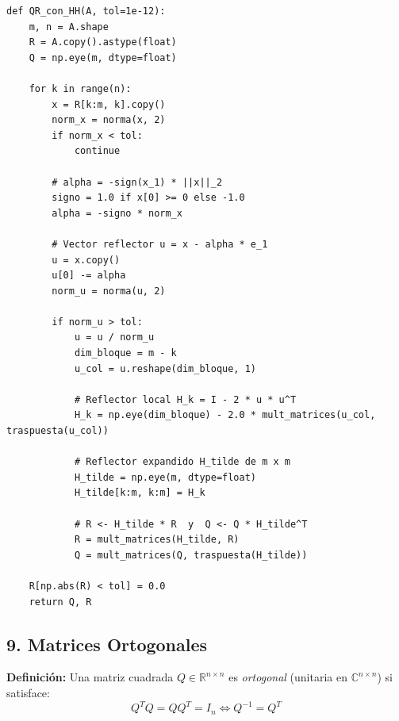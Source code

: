\documentclass[11pt,a4paper]{article}
\begin{document}
\begin{verbatim}
def QR_con_HH(A, tol=1e-12):
    m, n = A.shape
    R = A.copy().astype(float)
    Q = np.eye(m, dtype=float)

    for k in range(n):
        x = R[k:m, k].copy()
        norm_x = norma(x, 2)
        if norm_x < tol:
            continue

        # alpha = -sign(x_1) * ||x||_2
        signo = 1.0 if x[0] >= 0 else -1.0
        alpha = -signo * norm_x

        # Vector reflector u = x - alpha * e_1
        u = x.copy()
        u[0] -= alpha
        norm_u = norma(u, 2)

        if norm_u > tol:
            u = u / norm_u
            dim_bloque = m - k
            u_col = u.reshape(dim_bloque, 1)

            # Reflector local H_k = I - 2 * u * u^T
            H_k = np.eye(dim_bloque) - 2.0 * mult_matrices(u_col, traspuesta(u_col))

            # Reflector expandido H_tilde de m x m
            H_tilde = np.eye(m, dtype=float)
            H_tilde[k:m, k:m] = H_k

            # R <- H_tilde * R  y  Q <- Q * H_tilde^T
            R = mult_matrices(H_tilde, R)
            Q = mult_matrices(Q, traspuesta(H_tilde))

    R[np.abs(R) < tol] = 0.0
    return Q, R
\end{verbatim}

\subsection*{9. Matrices Ortogonales}

\textbf{Definición:} Una matriz cuadrada $Q \in \mathbb{R}^{n \times n}$ es \emph{ortogonal} (unitaria en $\mathbb{C}^{n \times n}$) si satisface:
\[
Q^T Q = Q Q^T = I_n \iff Q^{-1} = Q^T
\]
\end{document}

